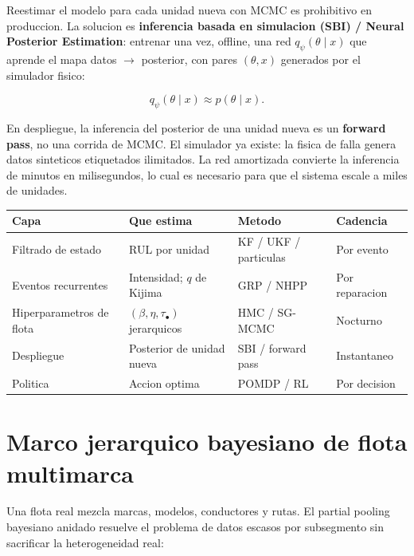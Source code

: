 \documentclass[11pt,a4paper]{article}
\begin{document}
Reestimar el modelo para cada unidad nueva con MCMC es prohibitivo en
produccion. La solucion es \textbf{inferencia basada en simulacion (SBI)
/ Neural Posterior Estimation}: entrenar una vez, offline, una red
$q_\psi(\theta \mid x)$ que aprende el mapa datos $\to$ posterior,
con pares $(\theta, x)$ generados por el simulador fisico:

$$q_\psi(\theta \mid x) \approx p(\theta \mid x).$$

En despliegue, la inferencia del posterior de una unidad nueva es un
\textbf{forward pass}, no una corrida de MCMC. El simulador ya existe:
la fisica de falla genera datos sinteticos etiquetados ilimitados.
La red amortizada convierte la inferencia de minutos en milisegundos,
lo cual es necesario para que el sistema escale a miles de unidades.

\medskip

\begin{center}
\small
\begin{tabular}{@{}p{3.4cm}p{4.0cm}p{2.8cm}p{2.4cm}@{}}
\toprule
\small\textbf{Capa} & \small\textbf{Que estima} & \small\textbf{Metodo}
  & \small\textbf{Cadencia} \\
\midrule
\rowcolor{rowalt}
\small Filtrado de estado & \small RUL por unidad & \small KF / UKF / particulas
  & \small Por evento \\
\small Eventos recurrentes & \small Intensidad; $q$ de Kijima & \small GRP / NHPP
  & \small Por reparacion \\
\rowcolor{rowalt}
\small Hiperparametros de flota & \small $(\beta, \eta, \tau_\bullet)$ jerarquicos
  & \small HMC / SG-MCMC & \small Nocturno \\
\small Despliegue & \small Posterior de unidad nueva & \small SBI / forward pass
  & \small Instantaneo \\
\rowcolor{rowalt}
\small Politica & \small Accion optima & \small POMDP / RL & \small Por decision \\
\bottomrule
\end{tabular}
\end{center}

\section{Marco jerarquico bayesiano de flota multimarca}

Una flota real mezcla marcas, modelos, conductores y rutas. El partial
pooling bayesiano anidado resuelve el problema de datos escasos por
subsegmento sin sacrificar la heterogeneidad real:
\end{document}
